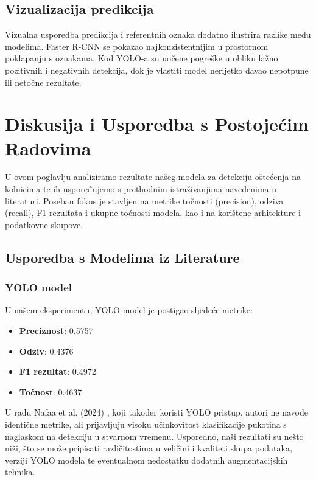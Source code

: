 \documentclass[conference]{IEEEtran}
\begin{document}
\subsection{Vizualizacija predikcija}

Vizualna usporedba predikcija i referentnih oznaka dodatno ilustrira razlike među modelima. Faster R-CNN se pokazao najkonzistentnijim u prostornom poklapanju s oznakama. Kod YOLO-a su uočene pogreške u obliku lažno pozitivnih i negativnih detekcija, dok je vlastiti model nerijetko davao nepotpune ili netočne rezultate.


\section{Diskusija i Usporedba s Postojećim Radovima}
U ovom poglavlju analiziramo rezultate našeg modela za detekciju oštećenja na kolnicima te ih uspoređujemo s prethodnim istraživanjima navedenima u literaturi. Poseban fokus je stavljen na metrike točnosti (precision), odziva (recall), F1 rezultata i ukupne točnosti modela, kao i na korištene arhitekture i podatkovne skupove.

\subsection{Usporedba s Modelima iz Literature}

\subsubsection*{YOLO model}

U našem eksperimentu, YOLO model je postigao sljedeće metrike:
\begin{itemize}
    \item \textbf{Preciznost}: 0.5757
    \item \textbf{Odziv}: 0.4376
    \item \textbf{F1 rezultat}: 0.4972
    \item \textbf{Točnost}: 0.4637
\end{itemize}

U radu Nafaa et al. (2024) \cite{nafaa2024}, koji također koristi YOLO pristup, autori ne navode identične metrike, ali prijavljuju visoku učinkovitost klasifikacije pukotina s naglaskom na detekciju u stvarnom vremenu. Usporedno, naši rezultati su nešto niži, što se može pripisati različitostima u veličini i kvaliteti skupa podataka, verziji YOLO modela te eventualnom nedostatku dodatnih augmentacijskih tehnika.
\end{document}
